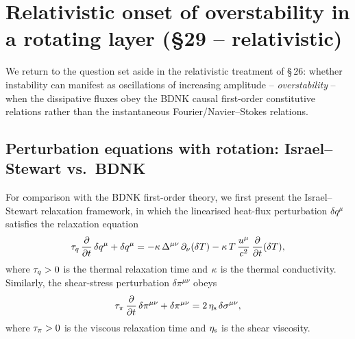 %
%
%

\section{Relativistic onset of overstability in a rotating layer (\S29 -- relativistic)}\label{sec:rel-3-29}

We return to the question set aside in the relativistic treatment of
\S\,26: whether instability can manifest as oscillations of increasing
amplitude -- \emph{overstability} -- when the dissipative fluxes obey
the BDNK causal first-order constitutive relations rather than the
instantaneous Fourier/Navier--Stokes relations.

\subsection{Perturbation equations with rotation: Israel--Stewart
vs.\ BDNK}

For comparison with the BDNK first-order theory, we first present
the Israel--Stewart relaxation framework, in which the linearised
heat-flux perturbation $\delta q^{\mu}$ satisfies the relaxation
equation
\begin{equation}\label{eq:rel-3-IS-heat}
  \tau_{q}\,\frac{\partial}{\partial t}\,\delta q^{\mu}
  + \delta q^{\mu}
  = -\kappa\,\Delta^{\mu\nu}\,\partial_{\nu}(\delta T)
  - \kappa\,T\,\frac{u^{\mu}}{c^{2}}\,
    \frac{\partial}{\partial t}(\delta T),
\end{equation}
where $\tau_{q} > 0$ is the thermal relaxation time and $\kappa$ is
the thermal conductivity.  Similarly, the shear-stress perturbation
$\delta\pi^{\mu\nu}$ obeys
\begin{equation}\label{eq:rel-3-IS-shear}
  \tau_{\pi}\,\frac{\partial}{\partial t}\,\delta\pi^{\mu\nu}
  + \delta\pi^{\mu\nu}
  = 2\,\eta_{\mathrm{s}}\,\delta\sigma^{\mu\nu},
\end{equation}
where $\tau_{\pi} > 0$ is the viscous relaxation time and $\eta_{\mathrm{s}}$ is
the shear viscosity.

